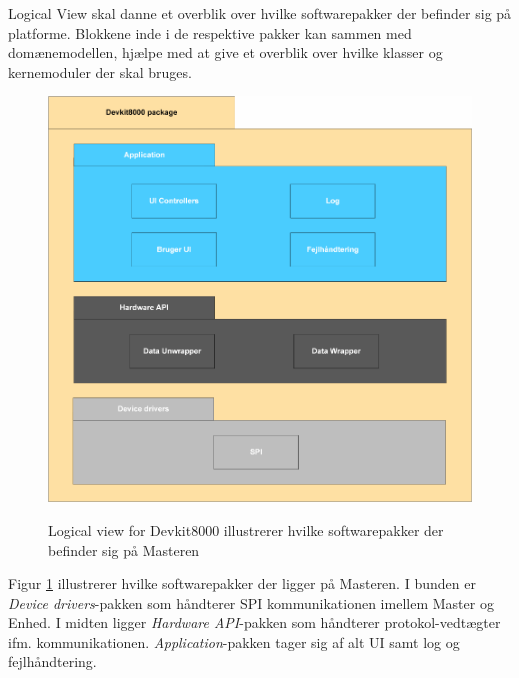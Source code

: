 
Logical View skal danne et overblik over hvilke softwarepakker der befinder sig på platforme. Blokkene inde i de respektive pakker kan sammen med domænemodellen, hjælpe med at give et overblik over hvilke klasser og kernemoduler der skal bruges.

\begin{figure}[htbp] \centering
{\includegraphics[scale=0.7]{filer/systemarkitektur/logical_view_devkit}}
\caption{Logical view for Devkit8000 illustrerer hvilke softwarepakker der befinder sig på Masteren }
\label{fig:Logical View Devkit8000}
\end{figure}

Figur \ref{fig:Logical View Devkit8000} illustrerer hvilke softwarepakker der ligger på Masteren. I bunden er \textit{Device drivers}-pakken som håndterer SPI kommunikationen imellem Master og Enhed. I midten ligger \textit{Hardware API}-pakken som håndterer protokol-vedtægter ifm. kommunikationen. \textit{Application}-pakken tager sig af alt UI samt log og fejlhåndtering.

\clearpage

